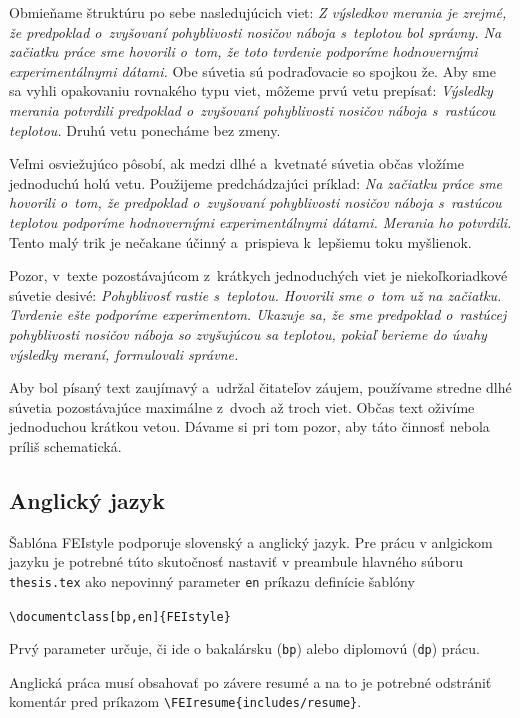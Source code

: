 Obmieňame štruktúru po sebe nasledujúcich viet:
\emph{Z výsledkov merania je zrejmé,
že predpoklad o~zvyšovaní pohyblivosti nosičov náboja
s~teplotou bol správny.
Na začiatku práce sme hovorili o~tom,
že toto tvrdenie podporíme hodnovernými experimentálnymi dátami.} 
Obe súvetia sú podraďovacie so spojkou že.
Aby sme sa vyhli opakovaniu rovnakého typu viet,
môžeme prvú vetu prepísať:
\emph{Výsledky merania potvrdili predpoklad o~zvyšovaní
pohyblivosti nosičov náboja s~rastúcou teplotou.}
Druhú vetu ponecháme bez zmeny.

Veľmi osviežujúco pôsobí, ak medzi dlhé a~kvetnaté súvetia
občas vložíme jednoduchú holú vetu.
Použijeme predchádzajúci príklad:
\emph{Na začiatku práce sme hovorili o~tom,
že predpoklad o~zvyšovaní pohyblivosti nosičov náboja
s~rastúcou teplotou podporíme hodnovernými
experimentálnymi dátami.
Merania ho potvrdili.}
Tento malý trik je nečakane účinný a~prispieva k~lepšiemu
toku myšlienok. 

Pozor, v~texte pozostávajúcom z~krátkych jednoduchých viet
je niekoľkoriadkové súvetie desivé:
\emph{Pohyblivosť rastie s~teplotou.
Hovorili sme o~tom už na začiatku.
Tvrdenie ešte podporíme experimentom.
Ukazuje sa, že sme predpoklad o~rastúcej pohyblivosti
nosičov náboja so zvyšujúcou sa teplotou,
pokiaľ berieme do úvahy výsledky meraní,
formulovali správne.}

Aby bol písaný text zaujímavý a~udržal čitateľov záujem, 
používame stredne dlhé súvetia pozostávajúce maximálne
z~dvoch až troch viet.
Občas text oživíme jednoduchou krátkou vetou.
Dávame si pri tom pozor,
aby táto činnosť nebola príliš schematická.

\subsection{Anglický jazyk}
Šablóna FEIstyle podporuje slovenský a anglický jazyk.
Pre prácu v anlgickom jazyku je potrebné túto skutočnosť nastaviť v preambule hlavného súboru \verb|thesis.tex| ako nepovinný parameter \verb|en| príkazu definície šablóny
\begin{trivlist}
\item \texttt{\textbackslash documentclass[bp,en]\{FEIstyle\}}
\end{trivlist}
Prvý parameter určuje, či ide o bakalársku (\verb|bp|) alebo diplomovú (\verb|dp|) prácu.

Anglická práca musí obsahovať po závere resumé a na to je potrebné odstrániť komentár pred príkazom
\verb|\FEIresume{includes/resume}|.

